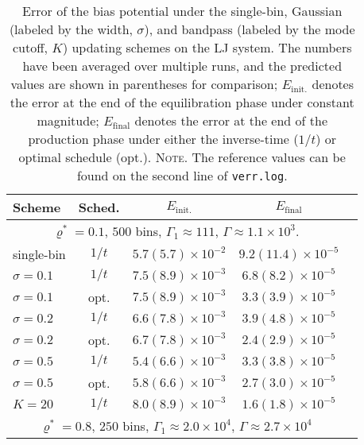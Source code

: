 \documentclass[reprint, superscriptaddress, floatfix]{revtex4-1}
\newcommand{\note}[1]{{\color{DarkGreen}\footnotesize \textsc{Note.} #1}}
\newcommand{\Err}{E}
\begin{document}
\begin{table}[h]\footnotesize
  \caption{\label{tab:lj_error}
    Error of the bias potential under
    the single-bin,
    Gaussian (labeled by the width, $\sigma$),
    and bandpass (labeled by the mode cutoff, $K$)
    updating schemes
    on the LJ system.
    The numbers have been averaged over multiple runs,
    and the predicted values are shown in parentheses for comparison;
    $\Err_\mathrm{init.}$
    denotes the error
    at the end of the equilibration phase under constant magnitude;
    $\Err_\mathrm{final}$
    denotes the error at the end of the production phase under
    either the inverse-time ($1/t$) or optimal schedule (opt.).
    \note{The reference values can be found
    on the second line of \texttt{verr.log}.}%
  }
  \setlength{\tabcolsep}{2pt}
  \renewcommand\arraystretch{1.4}
  \begin{tabular} { l c c c c }
    \hline
    Scheme & Sched. &
    $\Err_\mathrm{init.}$ &
    $\Err_\mathrm{final}$
    \\
    \hline
    \multicolumn{4}{c}{
      $\varrho^* = 0.1$,
      $500$ bins,
      $\Gamma_1 \approx 111$,
      $\Gamma \approx 1.1\times10^3$.
    } \\
    \hline
    single-bin & $1/t$
    & $5.7(5.7)\times10^{-2}$
    & $9.2(11.4)\times10^{-5}$
    \\
    $\sigma=0.1$ & $1/t$
    & $7.5(8.9)\times10^{-3}$
    & $6.8(8.2)\times10^{-5}$
    \\
    $\sigma=0.1$ & opt.
    & $7.5(8.9)\times10^{-3}$
    & $3.3(3.9)\times10^{-5}$
    \\
    $\sigma=0.2$ & $1/t$
    & $6.6(7.8)\times10^{-3}$
    & $3.9(4.8)\times10^{-5}$
    \\
    $\sigma=0.2$ & opt.
    & $6.7(7.8)\times10^{-3}$
    & $2.4(2.9)\times10^{-5}$
    \\
    $\sigma=0.5$ & $1/t$
    & $5.4(6.6)\times10^{-3}$
    & $3.3(3.8)\times10^{-5}$
    \\
    $\sigma=0.5$ & opt.
    & $5.8(6.6)\times10^{-3}$
    & $2.7(3.0)\times10^{-5}$
    \\
    $K=20$ & $1/t$
    & $8.0(8.9)\times10^{-3}$
    & $1.6(1.8)\times10^{-5}$
    \\
    \hline
    \multicolumn{4}{c}{
      $\varrho^* = 0.8$,
      $250$ bins,
      $\Gamma_1 \approx 2.0\times10^4$,
      $\Gamma \approx 2.7\times10^4$
    } \\

\end{tabular}
\end{table}
\end{document}

